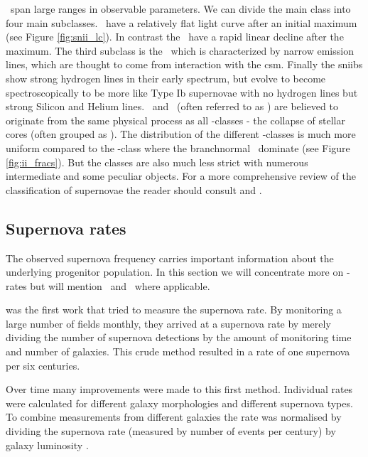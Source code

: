 \sneii\ span large ranges in observable parameters. We can divide the main class into four main subclasses. \sneiip\ have a relatively flat light curve after an initial maximum (see Figure \ref{fig:snii_lc}). In contrast the \sneiil\ have a rapid linear decline after the maximum. The third subclass is the \sniin\ which is characterized by narrow emission lines, which are thought to come from interaction with the \gls{csm}. Finally the \glspl{sniib} show strong hydrogen lines in their early spectrum, but evolve to become spectroscopically to be more like Type Ib supernovae with no hydrogen lines but strong Silicon and Helium lines. \sneib\ and \sneic\ (often referred to as \sneibc) are believed to originate from the same physical process as all \snii-classes - the collapse of stellar cores (often grouped as \sniiibc). The distribution of the different \snii-classes is much more uniform compared to the \snia-class where the \gls{branchnormal} \sneia\ dominate (see Figure \ref{fig:ii_fracs}). But the classes are also much less strict with numerous intermediate and some peculiar objects. For a more comprehensive review of the classification of supernovae the reader should consult \citet{2003LNP...598...21T} and \citet{2007AIPC..937..187T}.

\subsection{Supernova rates}
\label{sec:sn_rates}
The observed supernova frequency carries important information about the underlying progenitor population. In this section we will concentrate more on \sneia-rates but will mention \sneii\ and \sneibc\ where applicable.

\citet{1938ApJ....88..529Z} was the first work that tried to measure the supernova rate. By monitoring a large number of fields monthly, they arrived at a supernova rate by merely dividing the number of supernova detections by the amount of monitoring time and number of galaxies. This crude method resulted in a rate of one supernova per six centuries. 

Over time many improvements were made to this first method. Individual rates were calculated for different galaxy morphologies and different supernova types. To combine measurements from different galaxies the rate was normalised by dividing the supernova rate (measured by number of events per century) by galaxy luminosity \citep[e.g.][]{1991ARA&A..29..363V,1994ApJS...92..487T}. 

